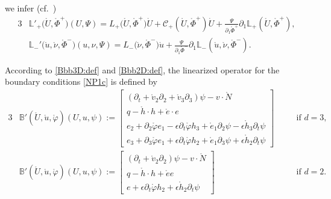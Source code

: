 \documentclass[twoside,11pt]{article}
\numberwithin{equation}{section}
\def\p{\partial}
\begin{document}
we infer (cf.~\cite[Proposition\,1.3.1]{M01MR1842775})
\begin{alignat}{3}
	&	\mathbb{L}'_+\big(\mathring{U},\mathring{\Phi}^+\big)(U,\Psi)
	=   {L}_{+}\big(\mathring{U},\mathring{\Phi}^+\big)\dot{U}+\mathcal{C}_{+}(\mathring{U},\mathring{\Phi}^+)\dot{U}  +\frac{\Psi}{\partial_1\mathring{\Phi}^+}	\partial_1\mathbb{L}_+(\mathring{U},\mathring{\Phi}^+ ),
	\label{Alinhac1}
	\\[1mm]
	&		\mathbb{L}_{-}'\big(\mathring{u},\mathring{{\nu}}, \mathring{\Phi}^-\big)(u,{\nu},\Psi)
	=
	L_-\big(\mathring{{\nu}} , \mathring{\Phi}^-\big)\dot{u}
	+\frac{\Psi}{\partial_1\mathring{\Phi}^-}\partial_1\mathbb{L}_-(\mathring{u},\mathring{{\nu}} , \mathring{\Phi}^- ).
	\label{Alinhac2}
\end{alignat}


According to \eqref{Bbb3D:def} and \eqref{Bbb2D:def}, the linearized operator for the boundary conditions \eqref{NP1c} is defined by
	\begin{alignat}{3}
&		\mathbb{B}'(\mathring{U} ,\mathring{u}, \mathring{\varphi})(U,u,\psi)
		:=%
		\begin{bmatrix}
			(\p_t + \mathring{v}_2 \p_2 + \mathring{v}_3 \p_3) \psi-v\cdot\mathring{N}\\[0.5mm]
			q-\mathring{h}\cdot h+ \mathring{e}\cdot e\\[0.5mm]				
			e_2+\p_2\mathring{\varphi} e_1-\epsilon \p_t\mathring{\varphi} h_3
			+\mathring{e}_1\p_2 \psi
			-\epsilon \mathring{h}_3 \p_t \psi\\[0.5mm]
			e_3+\p_3\mathring{\varphi} e_1+\epsilon \p_t\mathring{\varphi} h_2
			+\mathring{e}_1\p_3 \psi
			+\epsilon \mathring{h}_2 \p_t \psi
		\end{bmatrix}\quad &&\textrm{if }d=3,
		\label{B'bb3D:def}\\[1mm]
&		\mathbb{B}'(\mathring{U} ,\mathring{u}, \mathring{\varphi})(U,u,\psi)
:=%
\begin{bmatrix}
	(\p_t + \mathring{v}_2 \p_2  ) \psi-v\cdot\mathring{N}\\[0.5mm]
	q-\mathring{h}\cdot h+ \mathring{e} e\\[0.5mm]				
	e+\epsilon \p_t\mathring{\varphi} h_2
	+\epsilon \mathring{h}_2 \p_t \psi
\end{bmatrix}\quad &&\textrm{if }d=2.
\label{B'bb2D:def}		
	\end{alignat}
\end{document}
